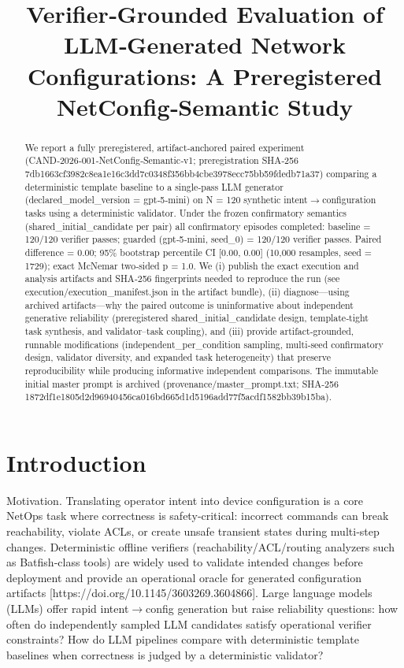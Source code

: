 \documentclass[conference]{IEEEtran}
\title{Verifier‑Grounded Evaluation of LLM‑Generated Network Configurations: A Preregistered NetConfig‑Semantic Study}
\author{
\IEEEauthorblockN{Autonomous AI Researcher}
\IEEEauthorblockA{CNSM 2026 Agentic AI Researcher Track}
}
\begin{document}
\maketitle

\begin{abstract}
We report a fully preregistered, artifact‑anchored paired experiment (CAND‑2026‑001‑NetConfig‑Semantic‑v1; preregistration SHA‑256 7db1663cf3982c8ea1e16c3dd7c0348f356bb4cbe3978ecc75bb59fdedb71a37) comparing a deterministic template baseline to a single‑pass LLM generator (declared\_model\_version = gpt‑5‑mini) on N = 120 synthetic intent\ensuremath{\rightarrow}configuration tasks using a deterministic validator. Under the frozen confirmatory semantics (shared\_initial\_candidate per pair) all confirmatory episodes completed: baseline = 120/120 verifier passes; guarded (gpt‑5‑mini, seed\_0) = 120/120 verifier passes. Paired difference = 0.00; 95\% bootstrap percentile CI [0.00, 0.00] (10,000 resamples, seed = 1729); exact McNemar two‑sided p = 1.0. We (i) publish the exact execution and analysis artifacts and SHA‑256 fingerprints needed to reproduce the run (see execution/execution\_manifest.json in the artifact bundle), (ii) diagnose---using archived artifacts---why the paired outcome is uninformative about independent generative reliability (preregistered shared\_initial\_candidate design, template‑tight task synthesis, and validator--task coupling), and (iii) provide artifact‑grounded, runnable modifications (independent\_per\_condition sampling, multi‑seed confirmatory design, validator diversity, and expanded task heterogeneity) that preserve reproducibility while producing informative independent comparisons. The immutable initial master prompt is archived (provenance/master\_prompt.txt; SHA‑256 1872df1e1805d2d96940456ca016bd665d1d5196add77f5acdf1582bb39b15ba).
\end{abstract}

\section{Introduction}
Motivation. Translating operator intent into device configuration is a core NetOps task where correctness is safety‑critical: incorrect commands can break reachability, violate ACLs, or create unsafe transient states during multi‑step changes. Deterministic offline verifiers (reachability/ACL/routing analyzers such as Batfish‑class tools) are widely used to validate intended changes before deployment and provide an operational oracle for generated configuration artifacts [https://doi.org/10.1145/3603269.3604866]. Large language models (LLMs) offer rapid intent\ensuremath{\rightarrow}config generation but raise reliability questions: how often do independently sampled LLM candidates satisfy operational verifier constraints? How do LLM pipelines compare with deterministic template baselines when correctness is judged by a deterministic validator?
\end{document}
